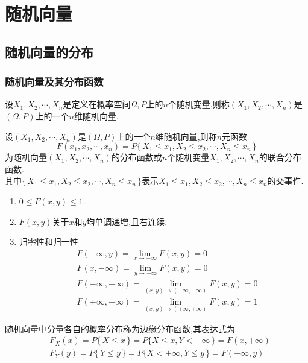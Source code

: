 \chapter{随机向量}
\section{随机向量的分布}
\subsection{随机向量及其分布函数}
\tdefination[随机向量]
设$X_1,X_2,\cdots,X_n$是定义在概率空间$\Omega ,P$上的$n$个随机变量,则称$(X_1,X_2,\cdots,X_n)$是$(\Omega,P)$上的一个$n$维随机向量.

设$(X_1,X_2,\cdots,X_n)$是$(\Omega,P)$上的一个$n$维随机向量,则称$n$元函数
\begin{equation}
F(x_1,x_2,\cdots,x_n)=P\lbrace \, X_1 \le x_1,X_2 \le x_2,\cdots ,X_n \le x_n \, \rbrace
\end{equation}
为随机向量$(X_1,X_2,\cdots,X_n)$的分布函数或$n$个随机变量$X_1,X_2,\cdots,X_n$的联合分布函数.\\
其中$\lbrace \, X_1 \le x_1,X_2 \le x_2,\cdots ,X_n \le x_n \, \rbrace$表示$ X_1 \le x_1,X_2 \le x_2,\cdots ,X_n \le x_n $的交事件.\jg\\
\dya[二维联合分布函数的性质]
\begin{enumerate}[1.]
	\setlength{\itemindent}{2em}
	\setlength{\topsep}{0.01em}
	\setlength{\itemsep}{0.01em}
	\item $0\le F(x,y)\le 1$.
	\item $F(x,y)$关于$x$和$y$均单调递增,且右连续.
	\item 归零性和归一性\sj
	\begin{equation*}
	\begin{split}
	&F(-\infty,y)=\lim\limits_{x\to -\infty } F(x,y)=0\\
	&F(x,-\infty )=\lim\limits_{y \to -\infty }F(x,y)=0\\
	&F(-\infty ,-\infty )=\lim\limits_{(x,y)\to (-\infty,-\infty)}F(x,y)=0\\
	&F(+\infty,+\infty)=\lim\limits_{(x,y)\to(+\infty,+\infty)}F(x,y)=1
	\end{split}
	\end{equation*}
\end{enumerate}

随机向量中分量各自的概率分布称为边缘分布函数,其表达式为
\begin{equation}
\begin{split}
&F_X(x)=P \lbrace \,X \le x\, \rbrace=P\lbrace X \le x, Y <+ \infty \, \rbrace=F(x,+\infty )\\
&F_Y(y)=P \lbrace \,Y \le y\, \rbrace=P\lbrace X < + \infty , Y \le  y \, \rbrace=F(+\infty,y )
\end{split}
\end{equation}

